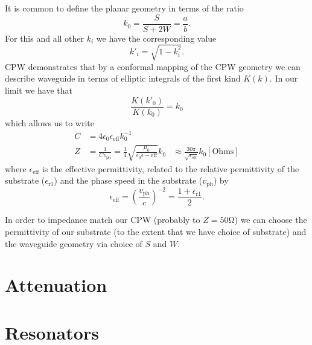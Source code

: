 \documentclass[a4paper]{article}
\begin{document}
It is common to define the planar geometry in terms of the ratio
\begin{equation}
  k_0 = \frac{S}{S+2W} = \frac{a}{b}.
  \label{eqn:kratio}
\end{equation}
For this and all other $k_i$ we have the corresponding value
\begin{equation}
  k'_i = \sqrt{1-k^2_i}.
\end{equation}
CPW demonstrates\cite{1127105} that by a conformal mapping of the CPW geometry
we can describe waveguide in terms of elliptic integrals of the first kind
$K(k)$. In our limit we have that
\begin{equation}
  \frac{K(k'_0)}{K(k_0)} = k_0
\end{equation}
which allows us to write
\begin{align}
  C &= 4\epsilon_0\epsilon_\mathrm{eff} k_0^{-1} \\
  Z &= \frac{1}{C v_\mathrm{ph}} = \frac{1}{4}\sqrt{\frac{\mu_0}{\epsilon_0
    \epsilon-\mathrm{eff}}}k_0
    &\approx \frac{30\pi}{\sqrt{\epsilon_\mathrm{eff}}}k_0 \mathrm{[Ohms]}
\end{align}
where  $\epsilon_\mathrm{eff}$ is the
effective permittivity, related to the relative permittivity of the substrate
($\epsilon_\mathrm{r1}$) and the phase speed in the substrate ($v_\mathrm{ph}$)
by
\begin{equation}
  \epsilon_\mathrm{eff} = \left(\frac{v_\mathrm{ph}}{c}\right)^{-2} = 
  \frac{1 + \epsilon_\mathrm{r1}}{2}.
\end{equation}


In order to impedance match our CPW (probably to $Z=50\si{\ohm}$) we can choose
the permittivity of our substrate (to the extent that we have choice of
substrate) and the waveguide geometry via choice of $S$ and $W$.

\section{Attenuation}

\section{Resonators}




\end{document}
